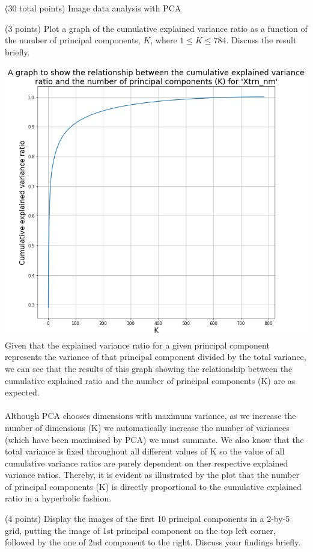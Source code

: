 \documentclass[12pt]{article}
\begin{document}
\begin{question}{(30 total points) Image data analysis with PCA}
\begin{subquestion}{(3 points)
       Plot a graph of the cumulative explained variance ratio as a function of the number of principal components, $K$, where $1\le K \le 784$.
       Discuss the result briefly.
     }
      \begin{answerbox}{52em}
         \includegraphics[width=1\textwidth]{images/q14.png}
        Given that the explained variance ratio for a given principal component represents the variance of that principal component divided by the total variance, we can see that the results of this graph showing the relationship between the cumulative explained ratio and the number of principal components (K) are as expected.\\
\\
        Although PCA chooses dimensions with maximum variance, as we increase the number of dimensions (K) we automatically increase the number of variances (which have been maximised by PCA) we must summate. We also know that the total variance is fixed throughout all different values of K so the value of all cumulative variance ratios are purely dependent on ther respective explained variance ratios. Thereby, it is evident as illustrated by the plot that the number of principal components (K) is directly proportional to the cumulative explained ratio in a hyperbolic fashion.
      \end{answerbox}
  


   \end{subquestion}

   \begin{subquestion}{(4 points)
      Display the images of the first 10 principal components in
      a 2-by-5 grid, putting the image of 1st principal component on
      the top left corner, followed by the one of 2nd component to the right.
      Discuss your findings briefly.
     } \label{Q1.disp.pca}
   


\end{subquestion}
\end{question}
\end{document}
